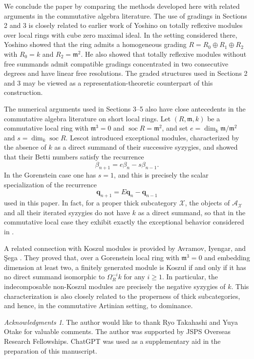\documentclass{amsart}
\theoremstyle{definition}
\theoremstyle{remark}
\newtheorem*{ac}{Acknowledgments}
\numberwithin{equation}{thm}
\def\A{\mathcal{A}}
\def\dim{\operatorname{dim}}
\def\ge{\geqslant}
\def\m{\mathfrak{m}}
\def\soc{\operatorname{soc}}
\def\X{\mathcal{X}}
\def\bfq{\mathbf{q}}
\begin{document}
We conclude the paper by comparing the methods developed here with related arguments in the commutative algebra literature.
The use of gradings in Sections 2 and 3 is closely related to earlier work of Yoshino \cite{Y03} on totally reflexive modules over local rings with cube zero maximal ideal.  In the setting considered there, Yoshino showed that the ring admits a homogeneous grading $R=R_0\oplus R_1\oplus R_2$ with $R_0=k$ and $R_2=\mathfrak m^2$. He also showed that totally reflexive modules without free summands admit compatible gradings concentrated in two consecutive degrees and have linear free resolutions. The graded structures used in Sections 2 and 3 may be viewed as a representation-theoretic counterpart of this construction.

The numerical arguments used in Sections 3--5 also have close antecedents in the commutative algebra literature on short local rings.  Let $(R,\m,k)$ be a commutative local ring with $\m^3=0$ and $\soc R=\m^2$, and set $e=\dim_k\m/\m^2$ and $s=\dim_k\soc R$.  Lescot \cite{L} introduced exceptional modules, characterized by the absence of $k$ as a direct summand of their successive syzygies, and showed that their Betti numbers satisfy the recurrence
$$
\beta_{n+1}=e\beta_n-s\beta_{n-1}.
$$
In the Gorenstein case one has $s=1$, and this is precisely the scalar specialization of the recurrence
$$
\bfq_{n+1}=E\bfq_n-\bfq_{n-1}
$$
used in this paper.  In fact, for a proper thick subcategory $\X$, the objects of $\A_\X$ and all their iterated syzygies do not have $k$ as a direct summand, so that in the commutative local case they exhibit exactly the exceptional behavior considered in \cite{L}.

A related connection with Koszul modules is provided by Avramov, Iyengar, and \c{S}ega \cite{AIS}. They proved that, over a Gorenstein local ring with $\m^3=0$ and embedding dimension at least two, a finitely generated module is Koszul if and only if it has no direct summand isomorphic to $\Omega_R^{-i}k$ for any $i\ge1$. In particular, the indecomposable non-Koszul modules are precisely the negative syzygies of $k$. This characterization is also closely related to the properness of thick subcategories, and hence, in the commutative Artinian setting, to dominance.

\begin{ac}
The author would like to thank Ryo Takahashi and Yuya Otake for valuable comments.
The author was supported by JSPS Overseas Research Fellowships.
ChatGPT was used as a supplementary aid in the preparation of this manuscript.
\end{ac}
\end{document}
